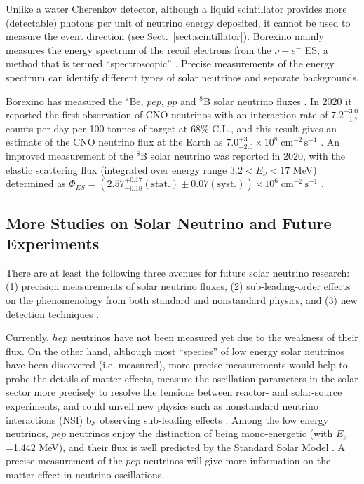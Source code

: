 Unlike a water Cherenkov detector, although a liquid scintillator provides more (detectable) photons per unit of neutrino energy deposited, it cannot be used to measure the event direction (see Sect.~\ref{sect:scintillator}). Borexino mainly measures the energy spectrum of the recoil electrons from the $\nu+e^-$ ES, a method that is termed ``spectroscopic'' \cite{agostini2020improved}. Precise measurements of the energy spectrum can identify different types of solar neutrinos and separate backgrounds.

Borexino has measured the $^7$Be, $pep$, $pp$ and $^8$B solar neutrino fluxes \cite{agostini2018comprehensive}. In 2020 it reported the first observation of CNO neutrinos with an interaction rate of $7.2^{+3.0}_{-1.7}$ counts per day per 100 tonnes of target at 68\% C.L., and this result gives an estimate of the CNO neutrino flux at the Earth as $7.0^{+3.0}_{-2.0}\times 10^8 \; \mathrm{cm^{-2} \, s^{-1}}$ \cite{borexino2020experimental}. An improved measurement of the $^8$B solar neutrino was reported in 2020, with the elastic scattering flux (integrated over energy range $3.2<E_\nu <17$ MeV) determined as $\Phi_{ES}=(2.57^{+0.17}_{-0.18}\mathrm{(stat.)}\pm 0.07\mathrm{(syst.)})\times 10^6 \; \mathrm{cm^{-2} \, s^{-1}}$ \cite{agostini2020improved}.

\subsection{More Studies on Solar Neutrino and Future Experiments}\label{sect:futureSolar}

There are at least the following three avenues for future solar neutrino research: (1) precision measurements of solar neutrino fluxes, (2) sub-leading-order effects on the phenomenology from both standard and nonstandard physics, and (3) new detection techniques \cite{antonio2018state}.

Currently, $hep$ neutrinos have not been measured yet due to the weakness of their flux. On the other hand, although most ``species'' of low energy solar neutrinos have been discovered (i.e. measured), more precise measurements would help to probe the details of matter effects, measure the oscillation parameters in the solar sector more precisely to resolve the tensions between reactor- and solar-source experiments, and could unveil new physics such as nonstandard neutrino interactions (NSI) by observing sub-leading effects \cite{gann2015everything}. Among the low energy neutrinos, $pep$ neutrinos enjoy the distinction of being mono-energetic (with $E_\nu$=1.442 MeV), and their flux is well predicted by the Standard Solar Model \cite{davini2016cno}. A precise measurement of the $pep$ neutrinos will give more information on the matter effect in neutrino oscillations. 


